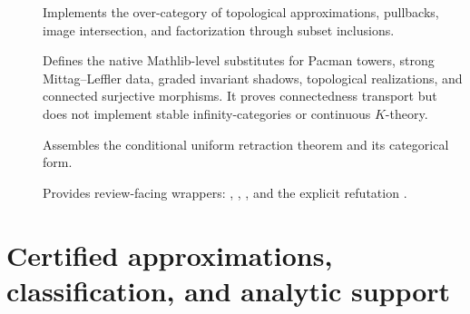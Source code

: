\begin{description}
\item[]
Implements the over-category of topological approximations, pullbacks, image
intersection, and factorization through subset inclusions.

\item[]
Defines the native Mathlib-level substitutes for Pacman towers, strong
Mittag--Leffler data, graded invariant shadows, topological realizations,
and connected surjective morphisms.  It proves connectedness transport but
does not implement stable infinity-categories or continuous $K$-theory.

\item[]
Assembles the conditional uniform retraction theorem and its categorical
form.

\item[]
Provides review-facing wrappers:
,
,
, and the explicit refutation
.
\end{description}

\section{Certified approximations, classification, and analytic support}

